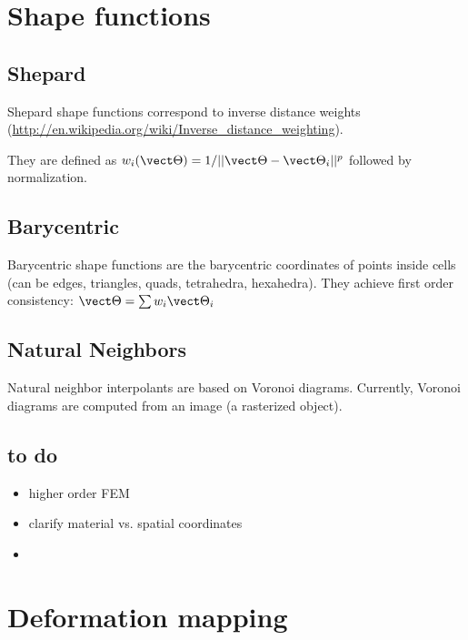 \section{Shape functions} \label{sec shape functions}

\subsection{Shepard}

Shepard shape functions correspond to inverse distance weights (\url{http://en.wikipedia.org/wiki/Inverse_distance_weighting}).

They are defined as $\shapef_i(\mCoord)=1/|| \mCoord-\mCoord_i ||^p$ followed by normalization.

\subsection{Barycentric}

Barycentric shape functions are the barycentric coordinates of points inside cells (can be edges, triangles, quads, tetrahedra, hexahedra).
They achieve first order consistency: $\mCoord= \sum \shapef_i \mCoord_i$
 
\subsection{Natural Neighbors}

Natural neighbor interpolants are based on Voronoi diagrams.
Currently, Voronoi diagrams are computed from an image (a rasterized object).

\subsection{to do}

\begin{itemize}
 \item higher order FEM
 \item clarify material vs. spatial coordinates
 \item 
\end{itemize}







\section{Deformation mapping} \label{sec deformation mapping}

